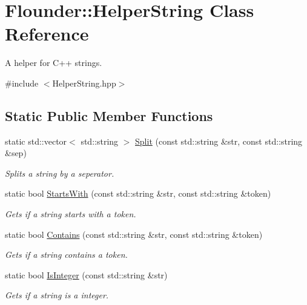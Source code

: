 \hypertarget{class_flounder_1_1_helper_string}{}\section{Flounder\+:\+:Helper\+String Class Reference}
\label{class_flounder_1_1_helper_string}


A helper for C++ strings.  




{\ttfamily \#include $<$Helper\+String.\+hpp$>$}

\subsection*{Static Public Member Functions}
\begin{DoxyCompactItemize}
\item 
static std\+::vector$<$ std\+::string $>$ \hyperlink{class_flounder_1_1_helper_string_a0108f5aee363ac9a51f92d83ca5e7de8}{Split} (const std\+::string \&str, const std\+::string \&sep)
\begin{DoxyCompactList}\small\item\em Splits a string by a seperator. \end{DoxyCompactList}\item 
static bool \hyperlink{class_flounder_1_1_helper_string_ae6da1f6e0bd955a0b9b6fd82dd2e2fbc}{Starts\+With} (const std\+::string \&str, const std\+::string \&token)
\begin{DoxyCompactList}\small\item\em Gets if a string starts with a token. \end{DoxyCompactList}\item 
static bool \hyperlink{class_flounder_1_1_helper_string_a064412f1f60e9de697f24104226ad1f8}{Contains} (const std\+::string \&str, const std\+::string \&token)
\begin{DoxyCompactList}\small\item\em Gets if a string contains a token. \end{DoxyCompactList}\item 
static bool \hyperlink{class_flounder_1_1_helper_string_ac99aa8b0be04276616d93c53bbba3eca}{Is\+Integer} (const std\+::string \&str)
\begin{DoxyCompactList}\small\item\em Gets if a string is a integer. \end{DoxyCompactList}\item 

\end{DoxyCompactItemize}
